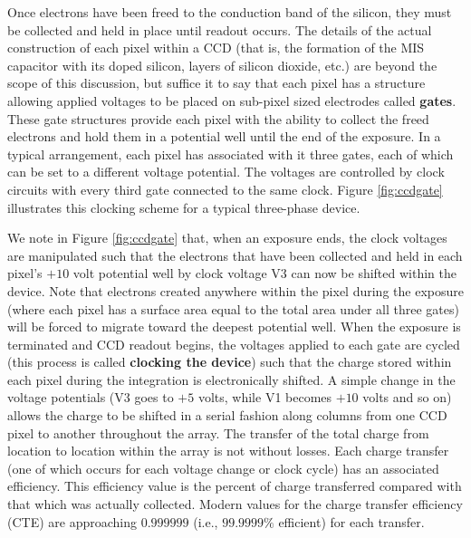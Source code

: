 \documentclass[a4paper,10pt]{article}
\begin{document}
{\noindent}Once electrons have been freed to the conduction band of the silicon, they must be collected and held in place until readout occurs. The details of the actual construction of each pixel within a CCD (that is, the formation of the MIS capacitor with its doped silicon, layers of silicon dioxide, etc.) are beyond the scope of this discussion, but suffice it to say that each pixel has a structure allowing applied voltages to be placed on sub-pixel sized electrodes called \textbf{gates}. These gate structures provide each pixel with the ability to collect the freed electrons and hold them in a potential well until the end of the exposure. In a typical arrangement, each pixel has associated with it three gates, each of which can be set to a different voltage potential. The voltages are controlled by clock circuits with every third gate connected to the same clock. Figure \ref{fig:ccdgate} illustrates this clocking scheme for a typical three-phase device.

{\noindent}We note in Figure \ref{fig:ccdgate} that, when an exposure ends, the clock voltages are manipulated such that the electrons that have been collected and held in each pixel's $+10$ volt potential well by clock voltage V3 can now be shifted within the device. Note that electrons created anywhere within the pixel during the exposure (where each pixel has a surface area equal to the total area under all three gates) will be forced to migrate toward the deepest potential well. When the exposure is terminated and CCD readout begins, the voltages applied to each gate are cycled (this process is called \textbf{clocking the device}) such that the charge stored within each pixel during the integration is electronically shifted. A simple change in the voltage potentials (V3 goes to $+5$ volts, while V1 becomes $+10$ volts and so on) allows the charge to be shifted in a serial fashion along columns from one CCD pixel to another throughout the array. The transfer of the total charge from location to location within the array is not without losses. Each charge transfer (one of which occurs for each voltage change or clock cycle) has an associated efficiency. This efficiency value is the percent of charge transferred compared with that which was actually collected. Modern values for the charge transfer efficiency (CTE) are approaching $0.999999$ (i.e., $99.9999\%$ efficient) for each transfer.
\end{document}
